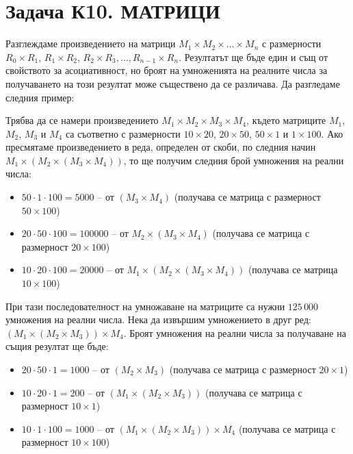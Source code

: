 \documentclass[12pt]{article}
\begin{document}
	
\section{Задача К10. МАТРИЦИ}

Разглеждаме произведението на матрици $M_1 \times M_2 \times \ldots \times M_n$ с размерности $R_0 \times R_1$, $R_1 \times R_2$, $R_2 \times R_3, \ldots, R_{n-1} \times R_n$. Резултатът ще бъде един и същ от свойството за асоциативност, но броят на умноженията на реалните числа за получаването на този резултат може съществено да се различава. Да разгледаме следния пример:

Трябва да се намери произведението $M_1 \times M_2 \times M_3 \times M_4$, където матриците $M_1$, $M_2$, $M_3$ и $M_4$ са съответно с размерности $10 \times 20$, $20 \times 50$, $50 \times 1$ и $1 \times 100$. Ако пресмятаме произведението в реда, определен от скоби, по следния начин $M_1 \times (M_2 \times (M_3 \times M_4))$, то ще получим следния брой умножения на реални числа:

\begin{itemize}
	\item $50 \cdot 1 \cdot 100 = 5000$ -- от $(M_3 \times M_4)$ (получава се матрица с размерност $50 \times 100$)
	\item $20 \cdot 50 \cdot 100 = 100000$ -- от $M_2 \times (M_3 \times M_4)$ (получава се матрица с размерност $20 \times 100$)
	\item $10 \cdot 20 \cdot 100 = 20000$ -- от $M_1 \times (M_2 \times (M_3 \times M_4))$ (получава се матрица $10 \times 100$)
\end{itemize}

При тази последователност на умножаване на матриците са нужни $125\,000$ умножения на реални числа. Нека да извършим умножението в друг ред: $(M_1 \times (M_2 \times M_3)) \times M_4$. Броят умножения на реални числа за получаване на същия резултат ще бъде:

\begin{itemize}
	\item $20 \cdot 50 \cdot 1 = 1000$ -- от $(M_2 \times M_3)$ (получава се матрица с размерност $20 \times 1$)
	\item $10 \cdot 20 \cdot 1 = 200$ -- от $(M_1 \times (M_2 \times M_3))$ (получава се матрица с размерност $10 \times 1$)
	\item $10 \cdot 1 \cdot 100 = 1000$ -- от $(M_1 \times (M_2 \times M_3)) \times M_4$ (получава се матрица с размерност $10 \times 100$)
\end{itemize}
\end{document}
